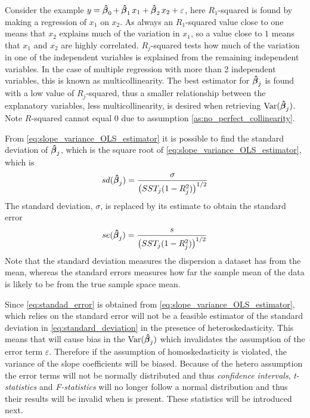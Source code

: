 Consider the example $y = \operatorname{\boldsymbol{\hat{\beta}}}_0 + \operatorname{\boldsymbol{\hat{\beta}}}_1 x_1 + \operatorname{\boldsymbol{\hat{\beta}}}_2 x_2 + \varepsilon$, here $R_1$-squared is found by making a regression of $x_1$ on $x_2$. 
As always an $R_1$-squared value close to one means that $x_2$ explains much of the variation in $x_1$, so a value close to $1$ means that $x_1$ and $x_2$ are highly correlated.
$R_j$-squared tests how much of the variation in one of the independent variables is explained from the remaining independent variables.
In the case of multiple regression with more than 2 independent variables, this is known as multicollinearity.
The best estimator for $\operatorname{\boldsymbol{\hat{\beta}}}_j$ is found with a low value of $R_j$-squared, thus a smaller relationship between the explanatory variables, less multicollinearity, is desired when retrieving $\operatorname{\text{Var}}(\operatorname{\boldsymbol{\hat{\beta}}}_j)$.
Note $R$-squared cannot equal $0$ due to assumption \ref{as:no_perfect_collinearity}. 

From \eqref{eq:slope_variance_OLS_estimator} it is possible to find the standard deviation of $\operatorname{\boldsymbol{\hat{\beta}}}_j$, which is the square root of \ref{eq:slope_variance_OLS_estimator}, which is
\begin{align}\label{eq:standard_deviation}
    sd(\operatorname{\boldsymbol{\hat{\beta}}}_j) = \dfrac{\sigma}{\left(SST_j(1- R_j^2)\right)^{1/2}}
\end{align}
The standard deviation, $\sigma$, is replaced by its estimate to obtain the standard error
\begin{align}\label{eq:standad_error}
    se(\operatorname{\boldsymbol{\hat{\beta}}}_j) = \dfrac{s}{\big(SST_j(1- R_j^2)\big)^{1/2}}
\end{align}
Note that the standard deviation measures the dispersion a dataset has from the mean, whereas the standard errors measures how far the sample mean of the data is likely to be from the true sample space mean. 

Since \eqref{eq:standad_error} is obtained from \eqref{eq:slope_variance_OLS_estimator}, which relies on \homo the standard error will not be a feasible estimator of the standard deviation in \eqref{eq:standard_deviation} in the presence of heteroskedasticity. This means that \hetero will cause bias in the $\operatorname{\text{Var}}(\operatorname{\boldsymbol{\hat{\beta}}}_j)$ which invalidates the assumption of the error term $\varepsilon$.
Therefore if the assumption of homoskedasticity is violated, the variance of the slope coefficients will be biased. Because of the hetero assumption the error terms will not be normally distributed and thus \textit{confidence intervals}, \textit{t-statistics} and \textit{F-statistics} will no longer follow a normal distribution and thus their results will be invalid when \hetero is present. These statistics will be introduced next.








